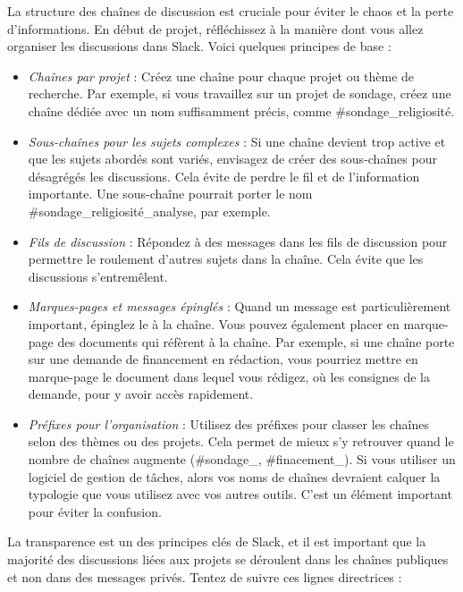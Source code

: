 \documentclass[
  letterpaper,
  DIV=11,
  numbers=noendperiod]{scrreprt}
\begin{document}
La structure des chaînes de discussion est cruciale pour éviter le chaos
et la perte d'informations. En début de projet, réfléchissez à la
manière dont vous allez organiser les discussions dans Slack. Voici
quelques principes de base :

\begin{itemize}
\item
  \emph{Chaînes par projet} : Créez une chaîne pour chaque projet ou
  thème de recherche. Par exemple, si vous travaillez sur un projet de
  sondage, créez une chaîne dédiée avec un nom suffisamment précis,
  comme \#sondage\_religiosité.
\item
  \emph{Sous-chaînes pour les sujets complexes} : Si une chaîne devient
  trop active et que les sujets abordés sont variés, envisagez de créer
  des sous-chaînes pour désagrégés les discussions. Cela évite de perdre
  le fil et de l'information importante. Une sous-chaîne pourrait porter
  le nom \#sondage\_religiosité\_analyse, par exemple.
\item
  \emph{Fils de discussion} : Répondez à des messages dans les fils de
  discussion pour permettre le roulement d'autres sujets dans la chaîne.
  Cela évite que les discussions s'entremêlent.
\item
  \emph{Marques-pages et messages épinglés} : Quand un message est
  particulièrement important, épinglez le à la chaîne. Vous pouvez
  également placer en marque-page des documents qui réfèrent à la
  chaîne. Par exemple, si une chaîne porte sur une demande de
  financement en rédaction, vous pourriez mettre en marque-page le
  document dans lequel vous rédigez, où les consignes de la demande,
  pour y avoir accès rapidement.
\item
  \emph{Préfixes pour l'organisation} : Utilisez des préfixes pour
  classer les chaînes selon des thèmes ou des projets. Cela permet de
  mieux s'y retrouver quand le nombre de chaînes augmente (\#sondage\_,
  \#finacement\_). Si vous utiliser un logiciel de gestion de tâches,
  alors vos noms de chaînes devraient calquer la typologie que vous
  utilisez avec vos autres outils. C'est un élément important pour
  éviter la confusion.
\end{itemize}

La transparence est un des principes clés de Slack, et il est important
que la majorité des discussions liées aux projets se déroulent dans les
chaînes publiques et non dans des messages privés. Tentez de suivre ces
lignes directrices :
\end{document}
